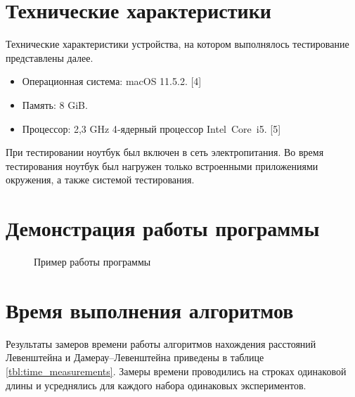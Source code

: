 \documentclass[a4paper,14pt, unknownkeysallowed]{extreport}
\newcommand{\img}[3] {
	\begin{figure}[h!]
		\center{\texttt{[image: img/\#2]}}
		\caption{#3}
		\label{img:#2}
	\end{figure}
}
\begin{document}
\section{Технические характеристики}

Технические характеристики устройства, на котором выполнялось тестирование представлены далее.

\begin{itemize}
    \item Операционная система: macOS 11.5.2. [4]
    \item Память: 8 GiB.
    \item Процессор: 2,3 GHz 4‑ядерный процессор Intel Core i5. [5]
\end{itemize}

При тестировании ноутбук был включен в сеть электропитания. Во время тестирования ноутбук был нагружен только встроенными приложениями окружения, а также системой тестирования.

\section{Демонстрация работы программы}

\img{100mm}{example}{Пример работы программы}
\clearpage

\section{Время выполнения алгоритмов}

Результаты замеров времени работы алгоритмов нахождения расстояний Левенштейна и Дамерау–Левенштейна приведены в таблице \ref{tbl:time_measurements}. Замеры времени проводились на строках одинаковой длины и усреднялись для каждого набора одинаковых экспериментов.
\end{document}
